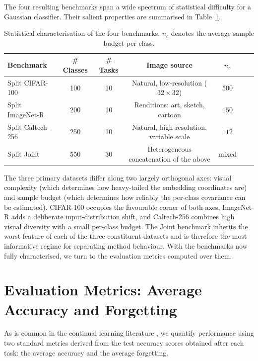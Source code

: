The four resulting benchmarks span a wide spectrum of statistical difficulty for a Gaussian classifier. Their salient properties are summarised in Table~\ref{tab:dataset_summary}.

\begin{table}[htbp]
	\centering
	\caption{Statistical characterisation of the four benchmarks. $\overline{n_c}$ denotes the average sample budget per class.}
	\label{tab:dataset_summary}
	\small
	\setlength{\tabcolsep}{4pt}
	\begin{tabular}{lcccccc}
		\toprule
		\textbf{Benchmark} & \textbf{\# Classes} & \textbf{\# Tasks} & \textbf{Image source} & $\overline{n_c}$\\
		\midrule
		Split CIFAR-100   & 100 & 10 & Natural, low-resolution ($32{\times}32$)   & $500$    \\
		Split ImageNet-R  & 200 & 10 & Renditions: art, sketch, cartoon          & $150$     \\
		Split Caltech-256 & 250 & 10 & Natural, high-resolution, variable scale  & $112$  \\
		Split Joint       & 550 & 30 & Heterogeneous concatenation of the above  & mixed    \\
		\bottomrule
	\end{tabular}
\end{table}

The three primary datasets differ along two largely orthogonal axes: visual complexity (which determines how heavy-tailed the embedding coordinates are) and sample budget (which determines how reliably the per-class covariance can be estimated). CIFAR-100 occupies the favourable corner of both axes, ImageNet-R adds a deliberate input-distribution shift, and Caltech-256 combines high visual diversity with a small per-class budget. The Joint benchmark inherits the worst feature of each of the three constituent datasets and is therefore the most informative regime for separating method behaviour. With the benchmarks now fully characterised, we turn to the evaluation metrics computed over them.

\section{Evaluation Metrics: Average Accuracy and Forgetting}
\label{sec:an:metrics}

 As is common in the continual learning literature \cite{wang2022learning}, we quantify performance using two standard metrics derived from the test accuracy scores obtained after each task: the average accuracy and the average forgetting.

